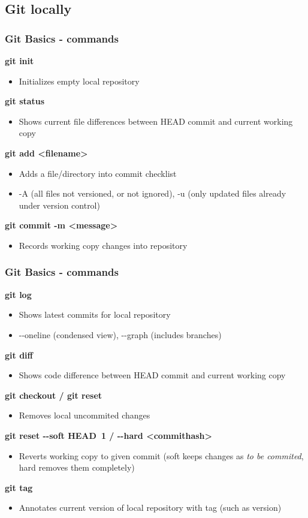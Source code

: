 \subsection[]{Git locally}
\begin{frame}
\frametitle{Git Basics - commands}

\textbf{git init}
	\begin{itemize}
	\item Initializes empty local repository
	\end{itemize}
\textbf{git status}
	\begin{itemize}
	\item Shows current file differences between HEAD commit and current working copy
	\end{itemize}
\textbf{git add <filename>}
	\begin{itemize}
	\item Adds a file/directory into commit checklist
	\item -A (all files not versioned, or not ignored), -u (only updated files already under version control)
	\end{itemize}
\textbf{git commit -m <message>}
	\begin{itemize}
	\item Records working copy changes into repository
	\end{itemize}
\end{frame}

\begin{frame}
\frametitle{Git Basics - commands}

\textbf{git log}
	\begin{itemize}
	\item Shows latest commits for local repository
	\item -{}-oneline (condensed view), -{}-graph (includes branches)
	\end{itemize}
\textbf{git diff}
	\begin{itemize}
	\item Shows code difference between HEAD commit and current working copy
	\end{itemize}
\textbf{git checkout / git reset}
	\begin{itemize}
	\item Removes local uncommited changes
	\end{itemize}
\textbf{git reset -{}-soft HEAD~1 / -{}-hard <commithash>}
	\begin{itemize}
	\item Reverts working copy to given commit (soft keeps changes as \emph{to be commited}, hard removes them completely)
	\end{itemize}
\textbf{git tag}
	\begin{itemize}
	\item Annotates current version of local repository with tag (such as version)
	\end{itemize}
\end{frame}

